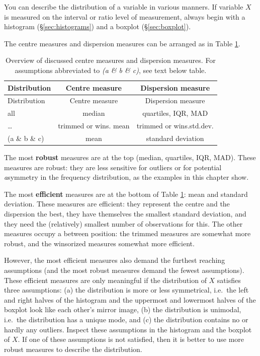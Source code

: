 \documentclass[
]{book}
\begin{document}
You can describe the distribution of a variable in various
manners.
If variable \(X\) is measured on the interval or ratio level of measurement,
always begin with a histogram (§\ref{sec:histograms})
and a boxplot (§\ref{sec:boxplot}).

The centre measures and dispersion measures can be arranged
as in Table \ref{tab:centredispersionmeasures}.

\begin{longtable}[]{@{}lcc@{}}
\caption{\label{tab:centredispersionmeasures} Overview of discussed centre measures and dispersion measures. For assumptions abbreviated to \emph{(a \& b \& c)}, see text below table.}\tabularnewline
\toprule\noalign{}
Distribution & Centre measure & Dispersion measure \\
\midrule\noalign{}
\endfirsthead
\toprule\noalign{}
Distribution & Centre measure & Dispersion measure \\
\midrule\noalign{}
\endhead
\bottomrule\noalign{}
\endlastfoot
all & median & quartiles, IQR, MAD \\
\ldots{} & trimmed or wins. mean & trimmed or wins.std.dev. \\
(a \& b \& c) & mean & standard deviation \\
\end{longtable}

The most \textbf{robust} measures are
at the top (median, quartiles, IQR, MAD). These measures are robust:
they are less sensitive for outliers or for potential \emph{a}symmetry in the
frequency distribution, as the examples in this chapter show.

The most \textbf{efficient} measures are at the bottom of
Table \ref{tab:centredispersionmeasures}: mean and standard deviation.
These measures are efficient: they represent the centre and the dispersion
the best, they have themselves the smallest standard deviation, and they need
the (relatively) smallest number of observations for this. The other measures
occupy a between position: the trimmed measures are somewhat more robust,
and the winsorized measures somewhat more efficient.

However, the most efficient measures also demand the furthest reaching
assumptions (and the most robust measures demand the fewest assumptions).
These efficient measures are only meaningful if the distribution of \(X\)
satisfies three assumptions: (a) the distribution is more or less
symmetrical, i.e.~the left and right halves of the histogram and
the uppermost and lowermost halves of the boxplot look like each other's
mirror image, (b) the distribution is unimodal, i.e.~the distribution has
a unique mode, and (c) the distribution contains no or hardly any outliers.
Inspect these assumptions in the histogram and the boxplot of \(X\). If one
of these assumptions is not satisfied, then it is better to use
more robust measures to describe the distribution.
\end{document}
